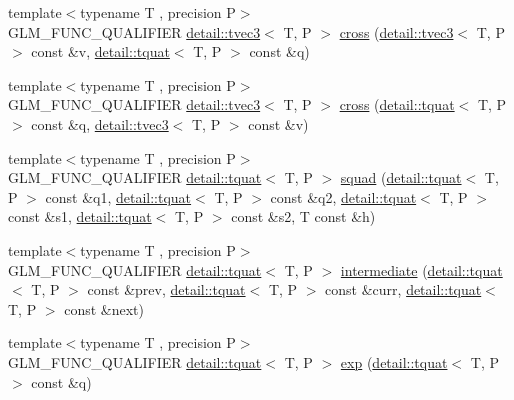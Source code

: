 \begin{DoxyCompactItemize}
\item 
{\footnotesize template$<$typename T , precision P$>$ }\\G\+L\+M\+\_\+\+F\+U\+N\+C\+\_\+\+Q\+U\+A\+L\+I\+F\+I\+ER \hyperlink{structglm_1_1detail_1_1tvec3}{detail\+::tvec3}$<$ T, P $>$ \hyperlink{group__gtx__quaternion_ga7794f940ba271ff846ea706204b0259a}{cross} (\hyperlink{structglm_1_1detail_1_1tvec3}{detail\+::tvec3}$<$ T, P $>$ const \&v, \hyperlink{structglm_1_1detail_1_1tquat}{detail\+::tquat}$<$ T, P $>$ const \&q)
\item 
{\footnotesize template$<$typename T , precision P$>$ }\\G\+L\+M\+\_\+\+F\+U\+N\+C\+\_\+\+Q\+U\+A\+L\+I\+F\+I\+ER \hyperlink{structglm_1_1detail_1_1tvec3}{detail\+::tvec3}$<$ T, P $>$ \hyperlink{group__gtx__quaternion_ga8b5c3ff869c773f26d0a562dfcd3f9e4}{cross} (\hyperlink{structglm_1_1detail_1_1tquat}{detail\+::tquat}$<$ T, P $>$ const \&q, \hyperlink{structglm_1_1detail_1_1tvec3}{detail\+::tvec3}$<$ T, P $>$ const \&v)
\item 
{\footnotesize template$<$typename T , precision P$>$ }\\G\+L\+M\+\_\+\+F\+U\+N\+C\+\_\+\+Q\+U\+A\+L\+I\+F\+I\+ER \hyperlink{structglm_1_1detail_1_1tquat}{detail\+::tquat}$<$ T, P $>$ \hyperlink{group__gtx__quaternion_ga5e756a5817856a3d69f0974fac8322e2}{squad} (\hyperlink{structglm_1_1detail_1_1tquat}{detail\+::tquat}$<$ T, P $>$ const \&q1, \hyperlink{structglm_1_1detail_1_1tquat}{detail\+::tquat}$<$ T, P $>$ const \&q2, \hyperlink{structglm_1_1detail_1_1tquat}{detail\+::tquat}$<$ T, P $>$ const \&s1, \hyperlink{structglm_1_1detail_1_1tquat}{detail\+::tquat}$<$ T, P $>$ const \&s2, T const \&h)
\item 
{\footnotesize template$<$typename T , precision P$>$ }\\G\+L\+M\+\_\+\+F\+U\+N\+C\+\_\+\+Q\+U\+A\+L\+I\+F\+I\+ER \hyperlink{structglm_1_1detail_1_1tquat}{detail\+::tquat}$<$ T, P $>$ \hyperlink{group__gtx__quaternion_ga96cb50103d939ea50d8b80bc898b2a35}{intermediate} (\hyperlink{structglm_1_1detail_1_1tquat}{detail\+::tquat}$<$ T, P $>$ const \&prev, \hyperlink{structglm_1_1detail_1_1tquat}{detail\+::tquat}$<$ T, P $>$ const \&curr, \hyperlink{structglm_1_1detail_1_1tquat}{detail\+::tquat}$<$ T, P $>$ const \&next)
\item 
{\footnotesize template$<$typename T , precision P$>$ }\\G\+L\+M\+\_\+\+F\+U\+N\+C\+\_\+\+Q\+U\+A\+L\+I\+F\+I\+ER \hyperlink{structglm_1_1detail_1_1tquat}{detail\+::tquat}$<$ T, P $>$ \hyperlink{group__gtx__quaternion_gaadebfad5c8b4b3dde114915f0494b739}{exp} (\hyperlink{structglm_1_1detail_1_1tquat}{detail\+::tquat}$<$ T, P $>$ const \&q)

\end{DoxyCompactItemize}
